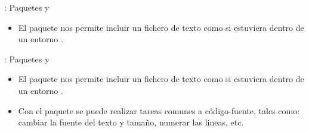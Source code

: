 \documentclass{beamer}
\begin{document}


\begin{frame}[fragile]{\insertsection: Paquetes  y }
  \begin{itemize}
  \item El paquete  nos permite incluir un fichero de
    texto como si estuviera dentro de un entorno .\\[2ex]
    \begin{exampletwouptiny}

    \end{exampletwouptiny}
  \end{itemize}
\end{frame}



\begin{frame}[fragile]{\insertsection: Paquetes  y }
  \begin{itemize}
  \item {\small El paquete  nos permite incluir un fichero de
      texto como si estuviera dentro de un entorno .}\\[2ex]
  \item {\small Con el paquete  se puede realizar
      tareas comunes a código-fuente, tales como: cambiar la fuente
      del texto y tamaño, numerar las líneas, etc.}\\[2ex]
    \begin{exampletwouptiny}
    \end{exampletwouptiny}

  \end{itemize}
\end{frame}

\end{document}
